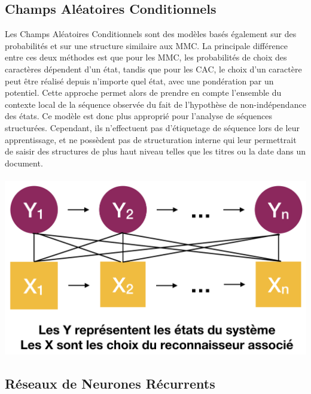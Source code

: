 \subsection{Champs Aléatoires Conditionnels}

Les Champs Aléatoires Conditionnels sont des modèles basés également sur des probabilités et
sur une structure similaire aux MMC. La principale différence entre ces deux méthodes est que pour les MMC,
les probabilités de choix des caractères dépendent d'un état, tandis que pour les CAC, le choix d'un
caractère peut être réalisé depuis n'importe quel état, avec une pondération par un potentiel.
Cette approche permet alors de prendre en compte l'ensemble du contexte local de la séquence observée
du fait de l'hypothèse de non-indépendance des états. Ce modèle est donc plus approprié pour l'analyse de
séquences structurées. Cependant, ils n'effectuent pas d'étiquetage de séquence lors de leur apprentissage,
et ne possèdent pas de structuration interne qui leur permettrait de saisir des structures de plus haut
niveau telles que les titres ou la date dans un document.

\paragraph{}
\begin{mdframed}[frametitle={Schéma de transition et d'observation d'un CAC}, innerbottommargin=10]
\begin{center}
\includegraphics[width=0.6\linewidth]{cac.png}
\end{center}
\end{mdframed}

\subsection{Réseaux de Neurones Récurrents}

